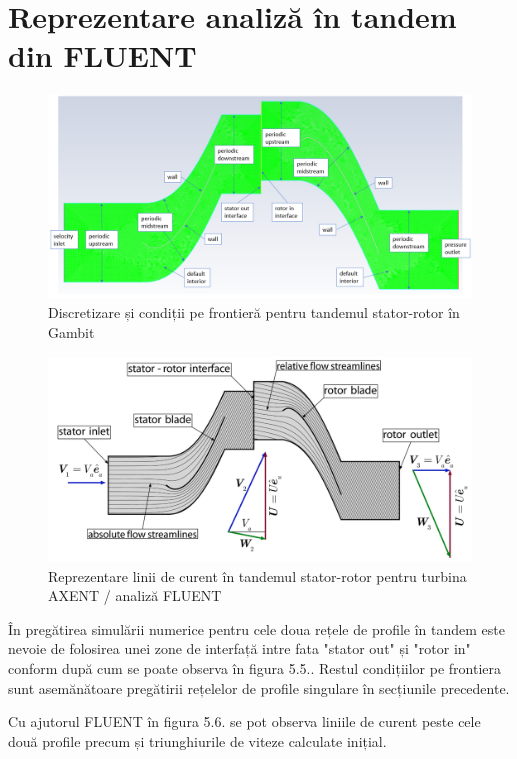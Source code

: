 \clearpage

\section{Reprezentare analiză în tandem din FLUENT}

\begin{figure}[h]
	\centering
	\includegraphics[scale=0.45]{figures/mesh-tandem-boundary.PNG}
	\caption{Discretizare și condiții pe frontieră pentru tandemul stator-rotor în Gambit}
	\label{Discretizare și condiții pe frontieră pentru tandemul stator-rotor în Gambit}
\end{figure}

\begin{figure}[!h]
	\centering
	\includegraphics[scale=0.5]{figures/AXENT-tandem-streamlines.PNG}
	\caption{Reprezentare linii de curent în tandemul stator-rotor pentru turbina AXENT / analiză FLUENT}
	\label{Reprezentare linii de curent în tandemul stator-rotor pentru turbina AXENT / analiză FLUENT}
\end{figure}


În pregătirea simulării numerice pentru cele doua rețele de profile în tandem este nevoie de folosirea unei zone de interfață intre fata "stator out" și "rotor in" conform după cum se poate observa în figura 5.5.. Restul condițiilor pe frontiera sunt asemănătoare pregătirii rețelelor de profile singulare în secțiunile precedente.

Cu ajutorul FLUENT în figura 5.6. se pot observa liniile de curent peste cele două profile precum și triunghiurile de viteze calculate inițial.

\clearpage